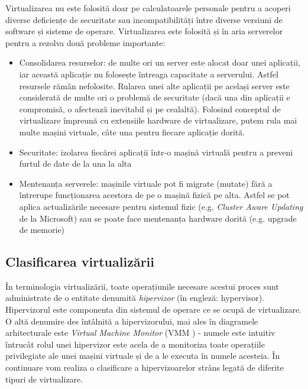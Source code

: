 Virtualizarea nu este folosită doar pe calculatoarele personale pentru a acoperi
diverse deficiențe de securitate sau incompatibilități între diverse versiuni de
software și sisteme de operare. Virtualizarea este folosită și în aria
serverelor pentru a rezolva două probleme importante:

\begin{itemize}
	\item Consolidarea resurselor: de multe ori un server este alocat doar
		unei aplicații, iar această aplicație nu folosește întreaga
		capacitate a serverului. Astfel resursele rămân nefolosite.
		Rularea unei alte aplicații pe același server este considerată
		de multe ori o problemă de securitate (dacă una din aplicații e
		compromisă, o afectează inevitabil și pe cealaltă). Folosind
		conceptul de virtualizare împreună cu extensiile hardware de
		virtualizare, putem rula mai multe mașini virtuale, câte una
		pentru fiecare aplicație dorită.
	\item Securitate: izolarea fiecărei aplicații într-o mașină virtuală
		pentru a preveni furtul de date de la una la alta
	\item Mentenanța serverele: mașinile virtuale pot fi migrate (mutate)
		fără a întrerupe funcționarea acestora de pe o mașină fizică pe
		alta. Astfel se pot aplica actualizările necesare pentru
		sistemul fizic (e.g. \textit{Cluster Aware Updating} de la
		Microsoft) sau se poate face mentenanța hardware dorită (e.g.
		upgrade de memorie)
\end{itemize}

\subsection{Clasificarea virtualizării}
\label{sec:vm-intro-class}

În terminologia virtualizării, toate operațiunile necesare acestui proces sunt
administrate de o entitate denumită \textit{hipervizor} (în engleză:
hypervisor). Hipervizorul este componenta din sistemul de operare ce se ocupă de
virtualizare. O altă denumire des întâlnită a hipervizorului, mai ales în
diagramele arhitecturale este \textit{Virtual Machine Monitor} (VMM
) - numele este intuitiv întrucât rolul
unei hipervizor este acela de a monitoriza toate operațiile privilegiate ale
unei mașini virtuale și de a le executa în numele acesteia. În continuare vom
realiza o clasificare a hipervizoarelor strâns legată de diferite tipuri de
virtualizare.

